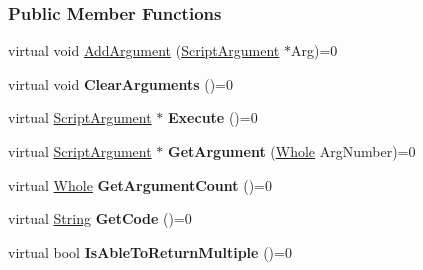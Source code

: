 \subsubsection*{Public Member Functions}
\begin{DoxyCompactItemize}
\item 
virtual void \hyperlink{classMezzanine_1_1Scripting_1_1Script_a0fa994729309867dff663c694218a33b}{AddArgument} (\hyperlink{classMezzanine_1_1Scripting_1_1ScriptArgument}{ScriptArgument} $\ast$Arg)=0
\item 
\hypertarget{classMezzanine_1_1Scripting_1_1Script_a504d19bd50b8d9c5b23e85c5e3131a96}{
virtual void {\bfseries ClearArguments} ()=0}
\label{classMezzanine_1_1Scripting_1_1Script_a504d19bd50b8d9c5b23e85c5e3131a96}

\item 
\hypertarget{classMezzanine_1_1Scripting_1_1Script_a4f167dbb18b66c36e6ff486751a79691}{
virtual \hyperlink{classMezzanine_1_1Scripting_1_1ScriptArgument}{ScriptArgument} $\ast$ {\bfseries Execute} ()=0}
\label{classMezzanine_1_1Scripting_1_1Script_a4f167dbb18b66c36e6ff486751a79691}

\item 
\hypertarget{classMezzanine_1_1Scripting_1_1Script_a578dfa2467c196599b531f8d3f9787fd}{
virtual \hyperlink{classMezzanine_1_1Scripting_1_1ScriptArgument}{ScriptArgument} $\ast$ {\bfseries GetArgument} (\hyperlink{namespaceMezzanine_adcbb6ce6d1eb4379d109e51171e2e493}{Whole} ArgNumber)=0}
\label{classMezzanine_1_1Scripting_1_1Script_a578dfa2467c196599b531f8d3f9787fd}

\item 
\hypertarget{classMezzanine_1_1Scripting_1_1Script_a20f82daec225f6090ac118272a92c968}{
virtual \hyperlink{namespaceMezzanine_adcbb6ce6d1eb4379d109e51171e2e493}{Whole} {\bfseries GetArgumentCount} ()=0}
\label{classMezzanine_1_1Scripting_1_1Script_a20f82daec225f6090ac118272a92c968}

\item 
\hypertarget{classMezzanine_1_1Scripting_1_1Script_ae0f1bb7cd4f537b19fcd862c977ee8e3}{
virtual \hyperlink{namespaceMezzanine_acf9fcc130e6ebf08e3d8491aebcf1c86}{String} {\bfseries GetCode} ()=0}
\label{classMezzanine_1_1Scripting_1_1Script_ae0f1bb7cd4f537b19fcd862c977ee8e3}

\item 
\hypertarget{classMezzanine_1_1Scripting_1_1Script_af52caa05f853b4fe6daf4a8d49fc182a}{
virtual bool {\bfseries IsAbleToReturnMultiple} ()=0}
\label{classMezzanine_1_1Scripting_1_1Script_af52caa05f853b4fe6daf4a8d49fc182a}


\end{DoxyCompactItemize}
